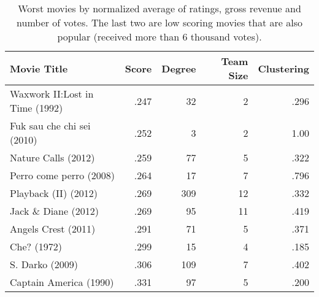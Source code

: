 \begin{table}[tb]
\caption{\label{tab:worst_movies}Worst movies by normalized average of ratings, gross revenue and number of votes. The last two are low scoring movies that are also popular (received more than 6 thousand votes).}
\centering
\begin{tabular}{lrrrr}\toprule
Movie Title                    & Score & Degree & Team Size & Clustering      \\ \midrule
Waxwork II:\@ Lost in Time (1992) & .247      & 32     & 2         & .296   \\
Fuk sau che chi sei (2010)     & .252      & 3      & 2         & 1.00        \\
Nature Calls (2012)            & .259      & 77     & 5         & .322      \\
Perro come perro (2008)        & .264      & 17     & 7         & .796   \\
Playback (II) (2012)           & .269      & 309    & 12        & .332   \\
Jack \& Diane (2012)           & .269      & 95     & 11        & .419   \\
Angels Crest (2011)            & .291      & 71     & 5         & .371   \\
Che? (1972)                    & .299      & 15     & 4         & .185  \\ \midrule
S. Darko (2009)                & .306      & 109    & 7         & .402    \\
Captain America (1990)         & .331      & 97     & 5         & .200      \\ \bottomrule
\end{tabular}
\end{table}
